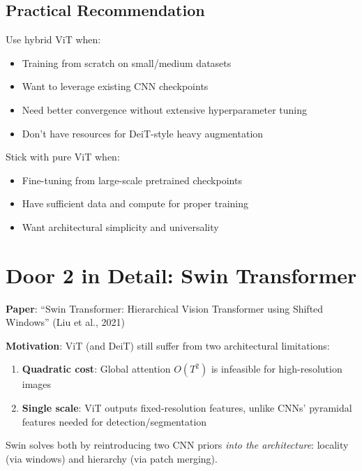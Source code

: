 \documentclass{article}
\begin{document}
\subsection{Practical Recommendation}

\begin{tcolorbox}[colback=blue!5!white, colframe=blue!50!black, title=When to Use Hybrid ViT]
Use hybrid ViT when:
\begin{itemize}
\item Training from scratch on small/medium datasets
\item Want to leverage existing CNN checkpoints
\item Need better convergence without extensive hyperparameter tuning
\item Don't have resources for DeiT-style heavy augmentation
\end{itemize}

Stick with pure ViT when:
\begin{itemize}
\item Fine-tuning from large-scale pretrained checkpoints
\item Have sufficient data and compute for proper training
\item Want architectural simplicity and universality
\end{itemize}
\end{tcolorbox}

\section{Door 2 in Detail: Swin Transformer}
\label{sec:swin}

\textbf{Paper}: ``Swin Transformer: Hierarchical Vision Transformer using Shifted Windows'' (Liu et al., 2021)

\textbf{Motivation}: ViT (and DeiT) still suffer from two architectural limitations:
\begin{enumerate}
\item \textbf{Quadratic cost}: Global attention $O(T^2)$ is infeasible for high-resolution images
\item \textbf{Single scale}: ViT outputs fixed-resolution features, unlike CNNs' pyramidal features needed for detection/segmentation
\end{enumerate}

Swin solves both by reintroducing two CNN priors \textit{into the architecture}: locality (via windows) and hierarchy (via patch merging).
\end{document}
